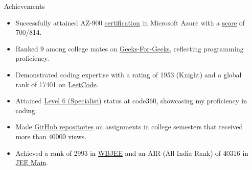 \documentclass{resume} %
\begin{document}
\begin{rSection}{Achievements} 
\begin{itemize}
\setlength\itemsep{-1.75em} %
     \item Successfully attained AZ-900 \href{https://learn.microsoft.com/en-in/users/arkapratimghosh-4932/credentials/certification-o-/azure-fundamentals}{certification} in Microsoft Azure with a \href{https://drive.google.com/file/d/1s7vbb-FW7VGSNXz2BCDkJnFmuanPQLEC/view}{score} of 700/814. \\
    \item   Ranked 9 among college mates on \href{https://www.geeksforgeeks.org/user/arkapratimghosh20021/?utm_source=geeksforgeeks&utm_medium=my_profile&utm_campaign=auth_user}{Geeks-For-Geeks}, reflecting programming proficiency. \\
    \item Demonstrated coding expertise with a rating of 1953 (Knight) and a global rank of 17401 on \href{https://leetcode.com/21Arka2002/}{LeetCode}. \\
    \item Attained \href{https://www.naukri.com/code360/profile/Arka2002}{Level 6 (Specialist)} status at code360, showcasing my proficiency in coding. \\
    \item Made \href{https://github.com/arkapg211002/TotalViewsProjectRepoReadme}{GitHub repositories} on assignments in college semesters that received more than 40000 views. \\
    \item Achieved a rank of 2993 in \href{https://drive.google.com/file/d/1xc6hvBjQhrxccVi4ENYZc62iL98IfvNh/view}{WBJEE} and an AIR (All India Rank) of 40316 in \href{https://drive.google.com/file/d/1xjdXfsoL_L62ij-P8jDuyyKQw9I1_Ht0/view}{JEE Main}.
\end{itemize}

% 

\end{rSection}




\end{document}
